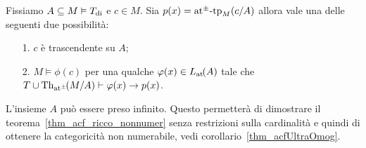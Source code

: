 % 
% 
% 

\begin{proposition}\label{prop_di_tipi princ_comp}
Fissiamo $A\subseteq M\models T_{\rm di}$ e  $c\in M$. Sia $p(x)=\pmatp_M(c/A)$ allora vale una delle seguenti due possibilit\`a:   
\begin{itemize}
\item[1.] $c$ \`e trascendente su $A$;
\item[2.] $M\models\phi(c)$ per una qualche $\phi(x)\in\aL(A)$ tale che 
$T\cup\Diag(M/A)\proves\phi(x)\imp p(x)$.
\end{itemize}
\end{proposition}

L'insieme $A$ pu\`o essere preso infinito. Questo permetter\`a di dimostrare il teorema~\ref{thm_acf_ricco_nonnumer} senza restrizioni sulla cardinalit\`a e quindi di ottenere la categoricit\`a non numerabile, vedi corollario~\ref{thm_acfUltraOmog}.

